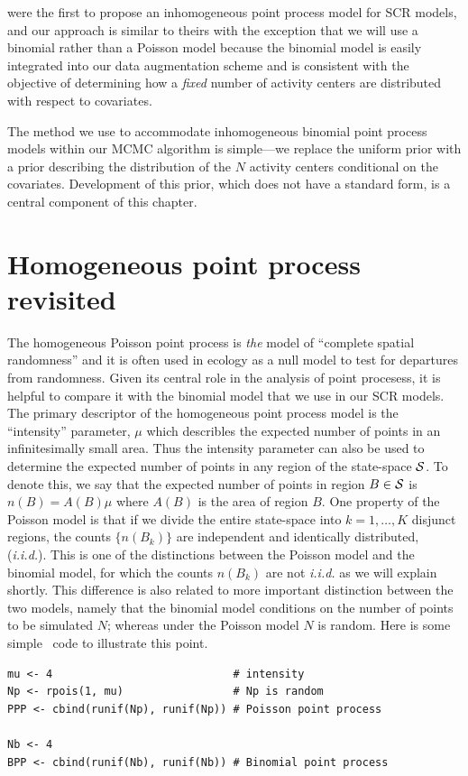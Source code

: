 \citet{borchers_efford:2008} were the first to propose an
inhomogeneous point process model for SCR models, and our approach is
similar to theirs with the exception that we will use a binomial
rather than a Poisson model because the binomial model is
easily integrated into our data augmentation scheme and is consistent
with the objective of determining how a {\it fixed} number of activity
centers are distributed with respect to covariates.

The method we use to accommodate inhomogeneous binomial point process
models within our MCMC algorithm is simple---we
replace the uniform prior with a prior describing the
distribution of
the $N$ activity centers conditional on the covariates. Development of
this prior, which does not have a
standard form, is a central component of this chapter.


\section{Homogeneous point process revisited}

The homogeneous Poisson point process is \emph{the} model of ``complete
spatial randomness'' and it is often used in ecology as a null model
to test for departures from randomness. Given its central role in the
analysis of point procesess, it is helpful to compare it with
the binomial model that we use in our SCR models. The
primary descriptor of the homogeneous point process model is the
``intensity'' parameter, $\mu$ which describles the expected number
of points in an infinitesimally small area. Thus the intensity
parameter can also be used to determine the expected number of points
in any region of the state-space $\cal{S}$. To denote this, we say
that the expected number of points in region $B \in \cal{S}$ is
$n(B) = A(B)\mu$ where $A(B)$ is the area of region $B$.  One property
of the Poisson model is that if we divide the entire state-space into
$k=1,\dots,K$ disjunct regions, the counts $\{n(B_k)\}$ are
independent and identically distributed, ({\it i.i.d.}). This is one
of the distinctions between the Poisson model and the binomial model,
for which the counts $n(B_k)$ are not {\it i.i.d.} as we will explain
shortly. This difference is also related to more important distinction
between the two models, namely that the binomial model
conditions on the number of points to be simulated $N$; whereas under
the Poisson model $N$ is random. Here is some simple \R~code to
illustrate this point.

\begin{verbatim}
mu <- 4                            # intensity
Np <- rpois(1, mu)                 # Np is random
PPP <- cbind(runif(Np), runif(Np)) # Poisson point process

Nb <- 4
BPP <- cbind(runif(Nb), runif(Nb)) # Binomial point process
\end{verbatim}

